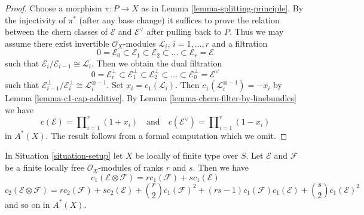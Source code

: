 \begin{proof}
Choose a morphism $\pi : P \to X$ as in
Lemma \ref{lemma-splitting-principle}.
By the injectivity of $\pi^*$ (after any base change)
it suffices to prove the relation between
the chern classes of $\mathcal{E}$ and $\mathcal{E}^\vee$
after pulling back to $P$. Thus we may assume there
exist invertible $\mathcal{O}_X$-modules
${\mathcal L}_i$, $i = 1, \ldots, r$
and a filtration
$$
0 = \mathcal{E}_0 \subset \mathcal{E}_1 \subset \mathcal{E}_2
\subset \ldots \subset \mathcal{E}_r = \mathcal{E}
$$
such that $\mathcal{E}_i/\mathcal{E}_{i - 1} \cong \mathcal{L}_i$.
Then we obtain the dual filtration
$$
0 = \mathcal{E}_r^\perp \subset \mathcal{E}_1^\perp \subset \mathcal{E}_2^\perp
\subset \ldots \subset \mathcal{E}_0^\perp = \mathcal{E}^\vee
$$
such that $\mathcal{E}_{i - 1}^\perp/\mathcal{E}_i^\perp \cong
\mathcal{L}_i^{\otimes -1}$.
Set $x_i = c_1(\mathcal{L}_i)$.
Then $c_1(\mathcal{L}_i^{\otimes -1}) = - x_i$
by Lemma \ref{lemma-c1-cap-additive}.
By Lemma \ref{lemma-chern-filter-by-linebundles}
we have
$$
c(\mathcal{E}) = \prod\nolimits_{i = 1}^r (1 + x_i)
\quad\text{and}\quad
c(\mathcal{E}^\vee) = \prod\nolimits_{i = 1}^r (1 - x_i)
$$
in $A^*(X)$. The result follows from a formal computation
which we omit.
\end{proof}

\begin{lemma}
\label{lemma-chern-classes-tensor-product}
In Situation \ref{situation-setup} let $X$ be locally of finite type over $S$.
Let $\mathcal{E}$ and $\mathcal{F}$ be a finite locally free
$\mathcal{O}_X$-modules of ranks $r$ and $s$. Then we have
$$
c_1(\mathcal{E} \otimes \mathcal{F})
=
r c_1(\mathcal{F}) + s c_1(\mathcal{E})
$$
$$
c_2(\mathcal{E} \otimes \mathcal{F})
=
r c_2(\mathcal{F}) + s c_2(\mathcal{E}) +
{r \choose 2} c_1(\mathcal{F})^2 +
(rs - 1) c_1(\mathcal{F})c_1(\mathcal{E}) +
{s \choose 2} c_1(\mathcal{E})^2
$$
and so on in $A^*(X)$.
\end{lemma}

